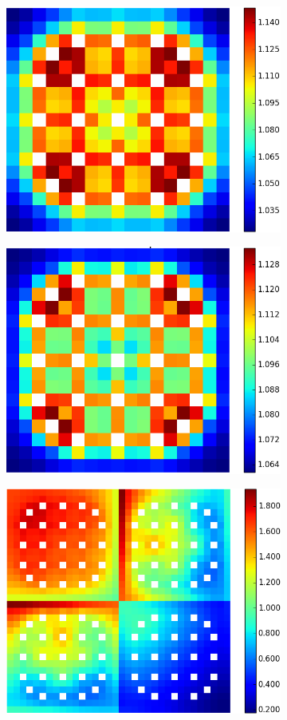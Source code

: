 \begin{figure}[h!]
\centering
\begin{subfigure}{0.45\textwidth}
  \centering
  \includegraphics[width=0.8\linewidth]{figures/assembly/fission-rates}
  \caption{}
  \label{fig:fiss-assm}
\end{subfigure}%
\begin{subfigure}{0.45\textwidth}
  \centering
  \includegraphics[width=0.8\linewidth]{figures/assembly/capture-rates}
  \caption{}
  \label{fig:capt-assm}
\end{subfigure}
\begin{subfigure}{0.45\textwidth}
  \centering
  \includegraphics[width=0.8\linewidth]{figures/reflector/fission-rates}

\end{subfigure}
\end{figure}
